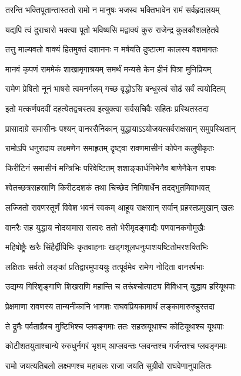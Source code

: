 \twolineshloka
{तरन्ति भक्तिपूतान्तास्ततो रामो न मानुषः}
{भजस्व भक्तिभावेन रामं सर्वहृदालयम्} %

\twolineshloka
{यद्यपि त्वं दुराचारो भक्त्या पूतो भविष्यसि}
{मद्वाक्यं कुरु राजेन्द्र कुलकौशलहेतवे} %

\twolineshloka
{तत्तु माल्यवतो वाक्यं हितमुक्तं दशाननः}
{न मर्षयति दुष्टात्मा कालस्य वशमागतः} %

\twolineshloka
{मानवं कृपणं राममेकं शाखामृगाश्रयम्}
{समर्थं मन्यसे केन हीनं पित्रा मुनिप्रियम्} %

\twolineshloka
{रामेण प्रेषितो नूनं भाषसे त्वमनर्गलम्}
{गच्छ वृद्धोऽसि बन्धुस्त्वं सोढं सर्वं त्वयोदितम्} %

\twolineshloka
{इतो मत्कर्णपदवीं दहत्येतद्वचस्तव}
{इत्युक्त्वा सर्वसचिवैः सहितः प्रस्थितस्तदा} %

\twolineshloka
{प्रासादाग्रे समासीनः पश्यन् वानरसैनिकान्}
{युद्धायाऽऽयोजयत्सर्वराक्षसान् समुपस्थितान्} %

\twolineshloka
{रामोऽपि धनुरादाय लक्ष्मणेन समाहृतम्}
{दृष्ट्वा रावणमासीनं कोपेन कलुषीकृतः} %

\twolineshloka
{किरीटिनं समासीनं मन्त्रिभिः परिवेष्टितम्}
{शशाङ्कार्धनिभेनैव बाणेनैकेन राघवः} %

\twolineshloka
{श्वेतच्छत्रसहस्राणि किरीटदशकं तथा}
{चिच्छेद निमिषार्धेन तदद्भुतमिवाभवत्} %

\twolineshloka
{लज्जितो रावणस्तूर्णं विवेश भवनं स्वकम्}
{आहूय राक्षसान् सर्वान् प्रहस्तप्रमुखान् खलः} %

\twolineshloka
{वानरैः सह युद्धाय नोदयामास सत्वरः}
{ततो भेरीमृदङ्गाद्यैः पणवानकगोमुखैः} %

\twolineshloka
{महिषोष्ट्रैः खरैः सिंहैर्द्वीपिभिः कृतवाहनाः}
{खड्गशूलधनुःपाशयष्टितोमरशक्तिभिः} %

\twolineshloka
{लक्षिताः सर्वतो लङ्कां प्रतिद्वारमुपाययुः}
{तत्पूर्वमेव रामेण नोदिता वानरर्षभाः} %

\twolineshloka
{उद्यम्य गिरिशृङ्गाणि शिखराणि महान्ति च}
{तरूंश्चोत्पाट्य विविधान् युद्धाय हरियूथपाः} %

\twolineshloka
{प्रेक्षमाणा रावणस्य तान्यनीकानि भागशः}
{राघवप्रियकामार्थं लङ्कामारुरुहुस्तदा} %

\twolineshloka
{ते द्रुमैः पर्वताग्रैश्च मुष्टिभिश्च प्लवङ्गमाः}
{ततः सहस्रयूथाश्च कोटियूथाश्च यूथपाः} %

\twolineshloka
{कोटीशतयुताश्चान्ये रुरुधुर्नगरं भृशम्}
{आप्लवन्तः प्लवन्तश्च गर्जन्तश्च प्लवङ्गमाः} %

\twolineshloka
{रामो जयत्यतिबलो लक्ष्मणश्च महाबलः}
{राजा जयति सुग्रीवो राघवेणानुपालितः} %

